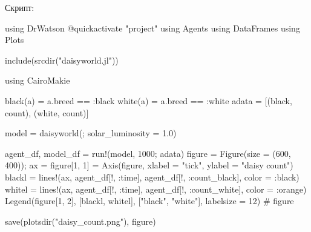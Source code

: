 \documentclass[
  english,
  russian,
  12pt,
  a4paper,
  DIV=11,
  numbers=noendperiod]{scrreprt}
\newenvironment{Shaded}{\begin{snugshade}}{\end{snugshade}}
\newcommand{\BuiltInTok}[1]{\textcolor[rgb]{0.00,0.23,0.31}{#1}}
\newcommand{\CommentTok}[1]{\textcolor[rgb]{0.37,0.37,0.37}{#1}}
\newcommand{\FloatTok}[1]{\textcolor[rgb]{0.68,0.00,0.00}{#1}}
\newcommand{\FunctionTok}[1]{\textcolor[rgb]{0.28,0.35,0.67}{#1}}
\newcommand{\ImportTok}[1]{\textcolor[rgb]{0.00,0.46,0.62}{#1}}
\newcommand{\NormalTok}[1]{\textcolor[rgb]{0.00,0.23,0.31}{#1}}
\newcommand{\OperatorTok}[1]{\textcolor[rgb]{0.37,0.37,0.37}{#1}}
\newcommand{\PreprocessorTok}[1]{\textcolor[rgb]{0.68,0.00,0.00}{#1}}
\newcommand{\StringTok}[1]{\textcolor[rgb]{0.13,0.47,0.30}{#1}}
\begin{document}
Скрипт:

\begin{Shaded}
\begin{Highlighting}[]
\ImportTok{using} \BuiltInTok{DrWatson}
\PreprocessorTok{@quickactivate} \StringTok{"project"}
\ImportTok{using} \BuiltInTok{Agents}
\ImportTok{using} \BuiltInTok{DataFrames}
\ImportTok{using} \BuiltInTok{Plots}


\FunctionTok{include}\NormalTok{(}\FunctionTok{srcdir}\NormalTok{(}\StringTok{"daisyworld.jl"}\NormalTok{))}

\ImportTok{using} \BuiltInTok{CairoMakie}

\FunctionTok{black}\NormalTok{(a) }\OperatorTok{=}\NormalTok{ a.breed }\OperatorTok{==} \OperatorTok{:}\NormalTok{black}
\FunctionTok{white}\NormalTok{(a) }\OperatorTok{=}\NormalTok{ a.breed }\OperatorTok{==} \OperatorTok{:}\NormalTok{white}
\NormalTok{adata }\OperatorTok{=}\NormalTok{ [(black, count), (white, count)]}

\NormalTok{model }\OperatorTok{=} \FunctionTok{daisyworld}\NormalTok{(; solar\_luminosity }\OperatorTok{=} \FloatTok{1.0}\NormalTok{)}

\NormalTok{agent\_df, model\_df }\OperatorTok{=} \FunctionTok{run!}\NormalTok{(model, }\FloatTok{1000}\NormalTok{; adata)}
\NormalTok{figure }\OperatorTok{=} \FunctionTok{Figure}\NormalTok{(size }\OperatorTok{=}\NormalTok{ (}\FloatTok{600}\NormalTok{, }\FloatTok{400}\NormalTok{));}
\NormalTok{ax }\OperatorTok{=}\NormalTok{ figure[}\FloatTok{1}\NormalTok{, }\FloatTok{1}\NormalTok{] }\OperatorTok{=} \FunctionTok{Axis}\NormalTok{(figure, xlabel }\OperatorTok{=} \StringTok{"tick"}\NormalTok{, ylabel }\OperatorTok{=} \StringTok{"daisy count"}\NormalTok{)}
\NormalTok{blackl }\OperatorTok{=} \FunctionTok{lines!}\NormalTok{(ax, agent\_df[!, }\OperatorTok{:}\NormalTok{time], agent\_df[!, }\OperatorTok{:}\NormalTok{count\_black], color }\OperatorTok{=} \OperatorTok{:}\NormalTok{black)}
\NormalTok{whitel }\OperatorTok{=} \FunctionTok{lines!}\NormalTok{(ax, agent\_df[!, }\OperatorTok{:}\NormalTok{time], agent\_df[!, }\OperatorTok{:}\NormalTok{count\_white], color }\OperatorTok{=} \OperatorTok{:}\NormalTok{orange)}
\FunctionTok{Legend}\NormalTok{(figure[}\FloatTok{1}\NormalTok{, }\FloatTok{2}\NormalTok{], [blackl, whitel], [}\StringTok{"black"}\NormalTok{, }\StringTok{"white"}\NormalTok{], labelsize }\OperatorTok{=} \FloatTok{12}\NormalTok{)}
\CommentTok{\# figure}

\FunctionTok{save}\NormalTok{(}\FunctionTok{plotsdir}\NormalTok{(}\StringTok{"daisy\_count.png"}\NormalTok{), figure)}
\end{Highlighting}
\end{Shaded}
\end{document}
